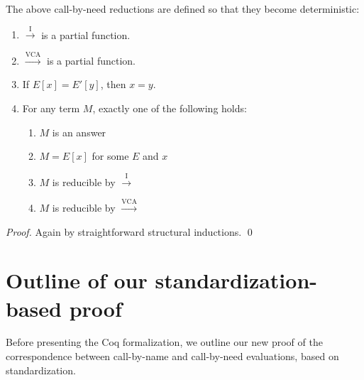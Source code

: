 \documentclass{llncs}
\newcommand{\CALLBYNEEDI}{\xrightarrow{\mathrm{I}}}
\newcommand{\CALLBYNEEDVCA}{\xrightarrow{\mathrm{VCA}}}
\begin{document}
The above call-by-need reductions are defined so that they become deterministic:
%
\begin{lemma}\label{determinism-of-call-by-need}
	\begin{enumerate}
		\item $\CALLBYNEEDI$ is a partial function.
		\item $\CALLBYNEEDVCA$ is a partial function.
		\item If $E[x]=E'[y]$, then $x=y$. \label{enum:demands}
		\item For any term $M$, exactly one of the following holds: \label{enum:total-need}
			\begin{enumerate}
				\item $M$ is an answer
				\item $M=E[x]$ for some $E$ and $x$ \label{enum:determinism-of-call-by-need-demand}
				\item $M$ is reducible by $\CALLBYNEEDI$
				\item $M$ is reducible by $\CALLBYNEEDVCA$
			\end{enumerate}
	\end{enumerate}
\end{lemma}
%
\begin{proof}
	Again by straightforward structural inductions. \qed
\end{proof}
%
%
\section{Outline of our standardization-based proof}\label{sec:informal-proofs}
%
Before presenting the Coq formalization, we outline our new proof of the correspondence between call-by-name and call-by-need evaluations, based on standardization.
\end{document}
